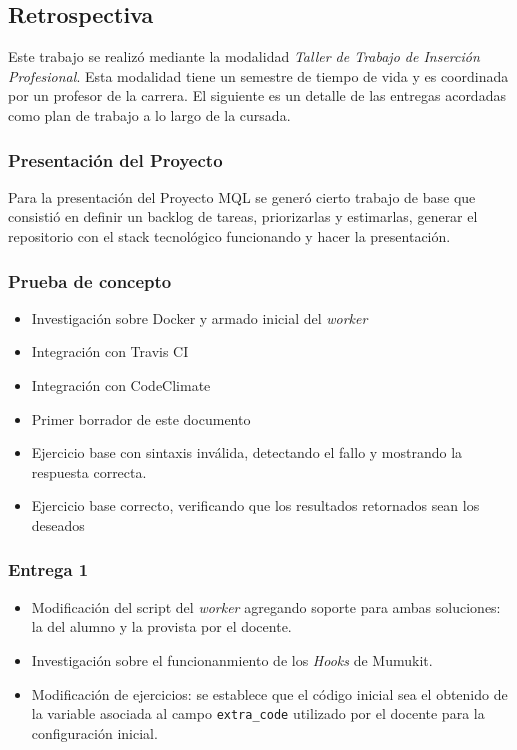 \subsection{Retrospectiva}

Este trabajo se realizó mediante la modalidad
\textit{Taller de Trabajo de Inserción Profesional}.
Esta modalidad tiene un semestre de tiempo de vida
y es coordinada por un profesor de la carrera.
El siguiente es un detalle de las entregas acordadas
como plan de trabajo a lo largo de la cursada.

\subsubsection{Presentación del Proyecto}

Para la presentación del Proyecto MQL se generó cierto
trabajo de base que consistió en definir un backlog de tareas,
priorizarlas y estimarlas, generar el repositorio con
el stack tecnológico funcionando y hacer la presentación.

\subsubsection{Prueba de concepto}

\begin{itemize}
    \item Investigación sobre Docker y armado inicial del \textit{worker}
    \item Integración con Travis CI
    \item Integración con CodeClimate
    \item Primer borrador de este documento
    \item Ejercicio base con sintaxis inválida, detectando el fallo
          y mostrando la respuesta correcta.
    \item Ejercicio base correcto, verificando que los
          resultados retornados sean los deseados
\end{itemize}

\subsubsection{Entrega 1}

\begin{itemize}
    \item Modificación del script del \textit{worker} agregando soporte
    para ambas soluciones: la del alumno y la provista por el docente.
    \item Investigación sobre el funcionanmiento de los \textit{Hooks} de Mumukit.
    \item Modificación de ejercicios: se establece que el código inicial
    sea el obtenido de la variable asociada al campo \texttt{extra\_code}
    utilizado por el docente para la configuración inicial.
\end{itemize}

